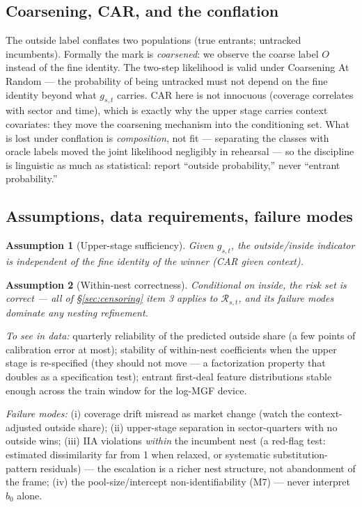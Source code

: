 \documentclass[11pt]{article}
\newcommand{\cR}{\mathcal{R}}
\newtheorem{assumption}{Assumption}
\numberwithin{assumption}{section}
\numberwithin{proposition}{section}
\numberwithin{remark}{section}
\begin{document}
\subsection{Coarsening, CAR, and the conflation}
The outside label conflates two populations (true entrants; untracked
incumbents). Formally the mark is \emph{coarsened}: we observe the coarse
label $O$ instead of the fine identity. The two-step likelihood is valid
under Coarsening At Random \citep{heitjan1991} --- the probability of being
untracked must not depend on the fine identity beyond what $g_{s,t}$
carries. CAR here is not innocuous (coverage correlates with sector and
time), which is exactly why the upper stage carries context covariates:
they move the coarsening mechanism into the conditioning set. What is lost
under conflation is \emph{composition}, not fit --- separating the classes
with oracle labels moved the joint likelihood negligibly in rehearsal ---
so the discipline is linguistic as much as statistical: report ``outside
probability,'' never ``entrant probability.''

\subsection{Assumptions, data requirements, failure modes}
\begin{assumption}[Upper-stage sufficiency]\label{as:s5_car}
Given $g_{s,t}$, the outside/inside indicator is independent of the fine
identity of the winner (CAR given context).
\end{assumption}
\begin{assumption}[Within-nest correctness]\label{as:s5_nest}
Conditional on inside, the risk set is correct --- all of
\S\ref{sec:censoring} item 3 applies to $\cR_{s,t}$, and its failure modes
dominate any nesting refinement.
\end{assumption}

\emph{To see in data:} quarterly reliability of the predicted outside share
(a few points of calibration error at most); stability of within-nest
coefficients when the upper stage is re-specified (they should not move ---
a factorization property that doubles as a specification test); entrant
first-deal feature distributions stable enough across the train window for
the log-MGF device.

\emph{Failure modes:}
(i) coverage drift misread as market change (watch the context-adjusted
outside share);
(ii) upper-stage separation in sector-quarters with no outside wins;
(iii) IIA violations \emph{within} the incumbent nest (a red-flag test:
estimated dissimilarity far from 1 when relaxed, or systematic
substitution-pattern residuals) --- the escalation is a richer nest
structure, not abandonment of the frame;
(iv) the pool-size/intercept non-identifiability (M7) --- never interpret
$b_0$ alone.
\end{document}
